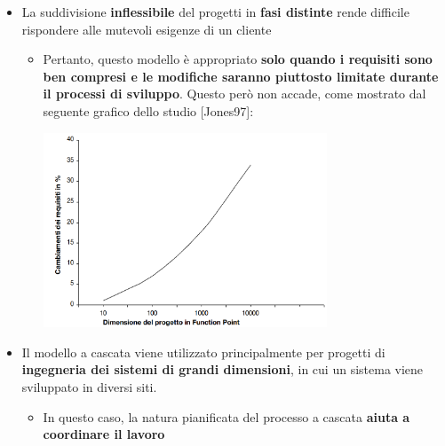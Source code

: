 \documentclass[12pt]{article}
\begin{document}
\begin{itemize}
    \item La suddivisione \textbf{inflessibile} del progetti in \textbf{fasi distinte} rende difficile rispondere alle mutevoli esigenze di un cliente
    \begin{itemize}
        \item Pertanto, questo modello è appropriato \textbf{solo quando i requisiti sono ben compresi e le modifiche saranno piuttosto limitate durante il processi di sviluppo}. Questo però non accade, come mostrato dal seguente grafico dello studio [Jones97]:
        \begin{center}
            \includegraphics[width = 0.70\textwidth]{Images/15.png}
        \end{center}
    \end{itemize}
    \item Il modello a cascata viene utilizzato principalmente per progetti di \textbf{ingegneria dei sistemi di grandi dimensioni}, in cui un sistema viene sviluppato in diversi siti.
    \begin{itemize}
        \item In questo caso, la natura pianificata del processo a cascata \textbf{aiuta a coordinare il lavoro}
    \end{itemize}
\end{itemize}
\end{document}
